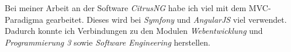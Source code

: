 \documentclass[chapterprefix=false, 12pt, a4paper, oneside, parskip=half, listof=totoc, bibliography=totoc, numbers=noendperiod]{scrbook}
\begin{document}
    Bei meiner Arbeit an der Software \textit{CitrusNG} habe ich viel mit dem MVC-Paradigma gearbeitet. Dieses wird bei \textit{Symfony}
    und \textit{AngularJS} viel verwendet. Dadurch konnte ich Verbindungen zu den Modulen \textit{Webentwicklung} und \textit{Programmierung 3}
    sowie \textit{Software Engineering} herstellen.




\end{document}
